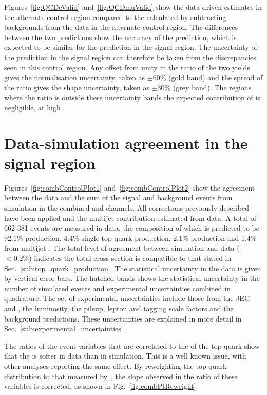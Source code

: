 Figures~\ref{fig:QCDeValid} and~\ref{fig:QCDmuValid} show the data-driven \QCD{} estimates in the alternate control region compared to the \QCD{} calculated by subtracting backgrounds from the data in the alternate control region.
The differences between the two predictions show the accuracy of the prediction, which is expected to be similar for the prediction in the signal region.
The uncertainty of the \QCD prediction in the signal region can therefore be taken from the discrepancies seen in this control region.
Any offset from unity in the ratio of the two \QCD{} yields gives the normalisation uncertainty, taken as $\pm60\%$ (gold band) and the spread of the ratio gives the shape uncertainty, taken as $\pm30\%$ (grey band).
The regions where the ratio is outside these uncertainty bands the expected contribution of \QCD{} is negligible, \eg{} at high \ptmiss{}.



\newpage
\section{Data-simulation agreement in the signal region} %

Figures~\ref{fig:combControlPlot1} and~\ref{fig:combControlPlot2} show the agreement between the data and the sum of the signal and background events from simulation in the combined \eJets{} and \muJets{} channels.
All corrections previously described have been applied and the multijet \QCD{} contribution estimated from data.
A total of 662 381 events are measured in data, the composition of which is predicted to be $92.1\%$ \ttbar{} production, 4.4\% single top quark production, 2.1\% \Vjets{} production and 1.4\% from multijet \QCD{}.
The total level of agreement between simulation and data ($<0.2\%$) indicates the total cross section is compatible to that stated in Sec.~\ref{sub:top_quark_production}.
The statistical uncertainty in the data is given by vertical error bars.
The hatched bands shows the statistical uncertainty in the number of simulated events and experimental uncertainties combined in quadrature.
The set of experimental uncertainties include those from the JEC and \ptmiss{}, the luminosity, the pileup, lepton and \bquark{} tagging scale factors and the background predictions.
These uncertainties are explained in more detail in Sec.~\ref{sub:experimental_uncertainties}.
\label{sec:data_simulation_agreement_in_the_signal_region}

The ratios of the event variables that are correlated to the \pt{} of the top quark show that the \ptTop{} is softer in data than in simulation.
This is a well known issue, with other analyses reporting the same effect. 
By reweighting the top quark \pt{} distribution to that measured by~\cite{TOP16007,TOP16008}, the slope observed in the ratio of these variables is corrected, as shown in Fig.~\ref{fig:combPtReweight}.

